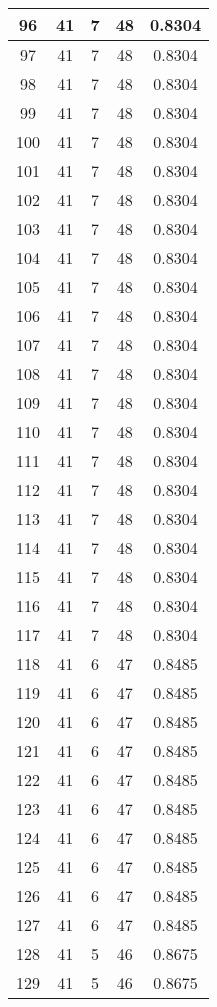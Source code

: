 \documentclass[letterpaper, 12pt]{article}
\begin{document}
\begin{longtable}{|c|c|c|c|c|}
\hline
96 & 41 & 7 & 48 & 0.8304 \\
\hline
97 & 41 & 7 & 48 & 0.8304 \\
\hline
98 & 41 & 7 & 48 & 0.8304 \\
\hline
99 & 41 & 7 & 48 & 0.8304 \\
\hline
100 & 41 & 7 & 48 & 0.8304 \\
\hline
101 & 41 & 7 & 48 & 0.8304 \\
\hline
102 & 41 & 7 & 48 & 0.8304 \\
\hline
103 & 41 & 7 & 48 & 0.8304 \\
\hline
104 & 41 & 7 & 48 & 0.8304 \\
\hline
105 & 41 & 7 & 48 & 0.8304 \\
\hline
106 & 41 & 7 & 48 & 0.8304 \\
\hline
107 & 41 & 7 & 48 & 0.8304 \\
\hline
108 & 41 & 7 & 48 & 0.8304 \\
\hline
109 & 41 & 7 & 48 & 0.8304 \\
\hline
110 & 41 & 7 & 48 & 0.8304 \\
\hline
111 & 41 & 7 & 48 & 0.8304 \\
\hline
112 & 41 & 7 & 48 & 0.8304 \\
\hline
113 & 41 & 7 & 48 & 0.8304 \\
\hline
114 & 41 & 7 & 48 & 0.8304 \\
\hline
115 & 41 & 7 & 48 & 0.8304 \\
\hline
116 & 41 & 7 & 48 & 0.8304 \\
\hline
117 & 41 & 7 & 48 & 0.8304 \\
\hline
118 & 41 & 6 & 47 & 0.8485 \\
\hline
119 & 41 & 6 & 47 & 0.8485 \\
\hline
120 & 41 & 6 & 47 & 0.8485 \\
\hline
121 & 41 & 6 & 47 & 0.8485 \\
\hline
122 & 41 & 6 & 47 & 0.8485 \\
\hline
123 & 41 & 6 & 47 & 0.8485 \\
\hline
124 & 41 & 6 & 47 & 0.8485 \\
\hline
125 & 41 & 6 & 47 & 0.8485 \\
\hline
126 & 41 & 6 & 47 & 0.8485 \\
\hline
127 & 41 & 6 & 47 & 0.8485 \\
\hline
128 & 41 & 5 & 46 & 0.8675 \\
\hline
129 & 41 & 5 & 46 & 0.8675 \\

\end{longtable}
\end{document}
